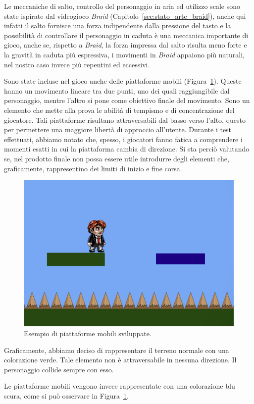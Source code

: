 Le meccaniche di salto, controllo del personaggio in aria ed utilizzo scale sono state ispirate dal videogioco \textit{Braid} (Capitolo~\ref{sec:stato_arte_braid}), anche qui infatti il salto fornisce una forza indipendente dalla pressione del tasto e la possibilità di controllare il personaggio in caduta è una meccanica importante di gioco, anche se, rispetto a \textit{Braid}, la forza impressa dal salto risulta meno forte e la gravità in caduta più espressiva, i movimenti in \textit{Braid} appaiono più naturali, nel nostro caso invece più repentini ed eccessivi.

Sono state incluse nel gioco anche delle piattaforme mobili (Figura~\ref{fig:platform_piattaforme_mobili}). Queste hanno un movimento lineare tra due punti, uno dei quali raggiungibile dal personaggio, mentre l’altro si pone come obiettivo finale del movimento. Sono un elemento che mette alla prova le abilità di tempismo e di concentrazione del giocatore. Tali piattaforme risultano attraversabili dal basso verso l’alto, questo per permettere una maggiore libertà di approccio all’utente.
Durante i test effettuati, abbiamo notato che, spesso, i giocatori fanno fatica a comprendere i momenti esatti in cui la piattaforma cambia di direzione. Si sta perciò valutando se, nel prodotto finale non possa essere utile introdurre degli elementi che, graficamente, rappresentino dei limiti di inizio e fine corsa.

\begin{figure}%
	\centering
	\includegraphics[width= 0.6\columnwidth]{images/gameDesign/07.jpg}
	\caption{Esempio di piattaforme mobili sviluppate.}
	\label{fig:platform_piattaforme_mobili}
\end{figure}

Graficamente, abbiamo deciso di rappresentare il terreno normale con una colorazione verde. Tale elemento non è attraversabile in nessuna direzione. Il personaggio collide sempre con esso.

Le piattaforme mobili vengono invece rappresentate con una colorazione blu scura, come si può osservare in Figura~\ref{fig:platform_piattaforme_mobili}.

